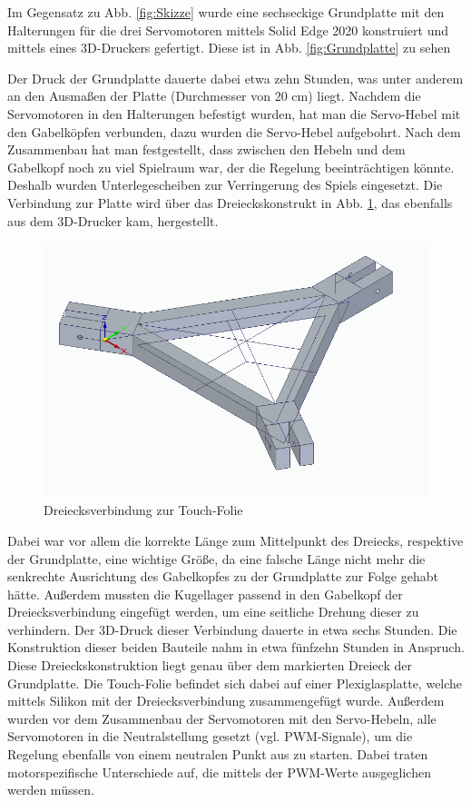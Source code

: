 \documentclass[12pt,a4paper,bibliography=totoc,listof=totoc]{scrartcl}
\begin{document}
Im Gegensatz zu Abb. \ref{fig:Skizze} wurde eine sechseckige Grundplatte mit den Halterungen für die drei 
Servomotoren mittels Solid Edge 2020 konstruiert und mittels eines 3D-Druckers gefertigt. Diese ist 
in Abb. \ref{fig:Grundplatte} zu sehen

Der Druck der Grundplatte dauerte dabei etwa zehn Stunden, was unter anderem an den Ausmaßen der Platte 
(Durchmesser von 20 cm) liegt. Nachdem die Servomotoren in den Halterungen befestigt wurden, hat man die 
Servo-Hebel mit den Gabelköpfen verbunden, dazu wurden die Servo-Hebel aufgebohrt. Nach dem Zusammenbau hat man 
festgestellt, dass zwischen den Hebeln und dem Gabelkopf noch zu viel Spielraum war, der die Regelung 
beeinträchtigen könnte. Deshalb wurden Unterlegescheiben zur Verringerung des Spiels eingesetzt. Die 
Verbindung zur Platte wird über das Dreieckskonstrukt in Abb.  \ref{fig:Dreiecksverbindung}, das ebenfalls aus dem 
3D-Drucker kam, hergestellt. 

\begin{figure}[htbp]
	\centering
	\includegraphics[scale = 0.45]{pics/BildDreieck}
	\caption{Dreiecksverbindung zur Touch-Folie}
	\label{fig:Dreiecksverbindung}
\end{figure}

Dabei war vor allem die korrekte Länge zum Mittelpunkt des Dreiecks, 
respektive der Grundplatte, eine wichtige Größe, da eine falsche Länge nicht mehr die senkrechte 
Ausrichtung des Gabelkopfes zu der Grundplatte zur Folge gehabt hätte. Außerdem mussten die Kugellager 
passend in den Gabelkopf der Dreiecksverbindung eingefügt werden, um eine seitliche Drehung dieser zu 
verhindern.
Der 3D-Druck dieser Verbindung dauerte in etwa sechs Stunden. Die Konstruktion dieser beiden Bauteile 
nahm in etwa fünfzehn Stunden in Anspruch. Diese Dreieckskonstruktion liegt genau über dem markierten 
Dreieck der Grundplatte. Die Touch-Folie befindet sich dabei auf einer Plexiglasplatte, welche mittels 
Silikon mit der Dreiecksverbindung zusammengefügt wurde.
Außerdem wurden vor dem Zusammenbau der Servomotoren mit den Servo-Hebeln, alle Servomotoren in die 
Neutralstellung gesetzt (vgl. PWM-Signale), um die Regelung ebenfalls von einem neutralen Punkt aus zu 
starten. Dabei traten motorspezifische Unterschiede auf, die mittels der PWM-Werte ausgeglichen werden 
müssen.
\end{document}
